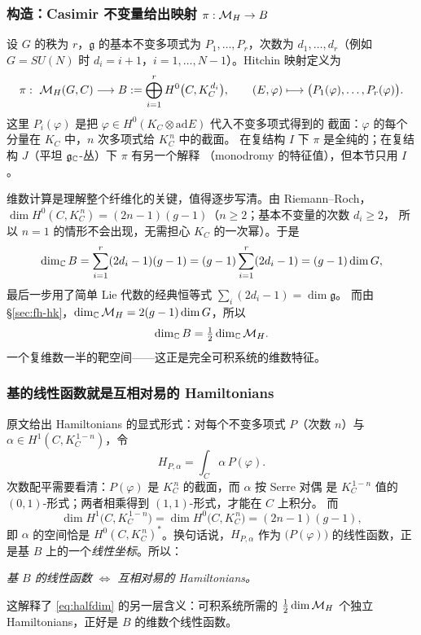 \subsubsection*{构造：Casimir 不变量给出映射 $\pi:\mathcal{M}_H\to B$}

设 $G$ 的秩为 $r$，$\mathfrak g$ 的基本不变多项式为 $P_1,\dots,P_r$，次数为
$d_1,\dots,d_r$（例如 $G=SU(N)$ 时 $d_i=i+1$，$i=1,\dots,N-1$）。Hitchin 映射定义为
\begin{equation}
\pi:\ \mathcal{M}_H(G,C)\longrightarrow B:=\bigoplus_{i=1}^{r}H^0\bigl(C,K_C^{\,d_i}\bigr),
\qquad (E,\varphi)\longmapsto\bigl(P_1(\varphi),\dots,P_r(\varphi)\bigr).
\label{eq:hitchin-map}
\end{equation}
这里 $P_i(\varphi)$ 是把 $\varphi\in H^0(K_C\otimes\mathrm{ad}E)$ 代入不变多项式得到的
截面：$\varphi$ 的每个分量在 $K_C$ 中，$n$ 次多项式给 $K_C^{\,n}$ 中的截面。
在复结构 $I$ 下 $\pi$ 是全纯的；在复结构 $J$（平坦 $\mathfrak{g}_{\mathbb{C}}$-丛）下 $\pi$ 有另一个解释
（monodromy 的特征值），但本节只用 $I$。\pA{}

维数计算是理解整个纤维化的关键，值得逐步写清。由 Riemann--Roch，
$\dim H^0(C,K_C^{\,n})=(2n-1)(g-1)$（$n\ge2$；基本不变量的次数 $d_i\ge2$，
所以 $n=1$ 的情形不会出现，无需担心 $K_C$ 的一次幂）。于是
\begin{equation}
\dim_{\mathbb{C}} B=\sum_{i=1}^{r}(2d_i-1)(g-1)=(g-1)\sum_{i=1}^{r}(2d_i-1)=(g-1)\dim G ,
\label{eq:dimB}
\end{equation}
最后一步用了简单 Lie 代数的经典恒等式 $\sum_i(2d_i-1)=\dim\mathfrak g$。
而由 §\ref{sec:fh-hk}，$\dim_{\mathbb{C}}\mathcal{M}_H=2(g-1)\dim G$，所以
\begin{equation}
\dim_{\mathbb{C}} B=\tfrac12\dim_{\mathbb{C}}\mathcal{M}_H .
\label{eq:halfdim}
\end{equation}
一个复维数一半的靶空间——这正是完全可积系统的维数特征。\pA{}

\subsubsection*{基的线性函数就是互相对易的 Hamiltonians}

原文给出 Hamiltonians 的显式形式：对每个不变多项式 $P$（次数 $n$）与
$\alpha\in H^1(C,K_C^{\,1-n})$，令\pA{}
\begin{equation}
H_{P,\alpha}=\int_C\alpha\,P(\varphi).
\label{eq:H}
\end{equation}
次数配平需要看清：$P(\varphi)$ 是 $K_C^{\,n}$ 的截面，而 $\alpha$ 按 Serre 对偶
是 $K_C^{\,1-n}$ 值的 $(0,1)$-形式；两者相乘得到 $(1,1)$-形式，才能在 $C$ 上积分。
而
\begin{equation}
\dim H^1\bigl(C,K_C^{\,1-n}\bigr)=\dim H^0\bigl(C,K_C^{\,n}\bigr)=(2n-1)(g-1),
\label{eq:serre}
\end{equation}
即 $\alpha$ 的空间恰是 $H^0(C,K_C^{\,n})^*$。换句话说，$H_{P,\alpha}$ 作为
$\bigl(P(\varphi)\bigr)$ 的线性函数，正是基 $B$ 上的一个\emph{线性坐标}。所以：
\begin{center}
\emph{基 $B$ 的线性函数 $\Longleftrightarrow$ 互相对易的 Hamiltonians。}
\end{center}
这解释了 \eqref{eq:halfdim} 的另一层含义：可积系统所需的 $\tfrac12\dim\mathcal{M}_H$ 个独立
Hamiltonians，正好是 $B$ 的维数个线性函数。\pB{}

